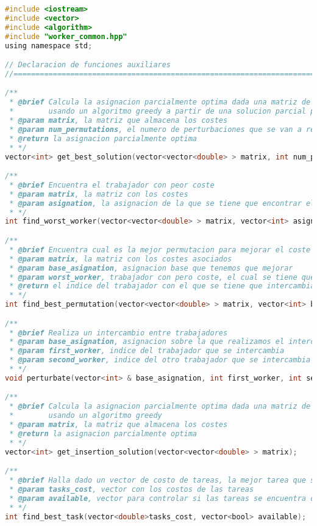 \documentclass[10pt, a4paper]{article}
\theoremstyle{theorem-style}
\theoremstyle{theorem-style}
\theoremstyle{definition-style}
\theoremstyle{remark-style}
\theoremstyle{example-style}
\theoremstyle{definition-style}
\theoremstyle{remark-style}
\begin{document}
\begin{lstlisting}[language=C]
#include <iostream>
#include <vector>
#include <algorithm>
#include "worker_common.hpp"
using namespace std;

// Declaracion de funciones auxiliares
//==============================================================================

/**
 * @brief Calcula la asignacion parcialmente optima dada una matriz de costes, 
 *        usando un algoritmo greedy a partir de una solucion parcial por insercion
 * @param matrix, la matriz que almacena los costes
 * @param num_permutations, el numero de perturbaciones que se van a realizar para mejorar la matriz
 * @return la asignacion parcialmente optima
 * */
vector<int> get_best_solution(vector<vector<double> > matrix, int num_permutations);

/**
 * @brief Encuentra el trabajador con peor coste
 * @param matrix, la matriz con los costes 
 * @param asignation, la asignacion de la que se tiene que encontrar el peor trabajador
 * */
int find_worst_worker(vector<vector<double> > matrix, vector<int> asignation);

/**
 * @brief Encuentra cual es la mejor permutacion para mejorar el coste de una asignacion
 * @param matrix, la matriz con los costes asociados
 * @param base_asignation, asignacion base que tenemos que mejorar
 * @param worst_worker, trabajador con pero coste, el cual se tiene que intercambiar con otro
 * @return el indice del trabajador con el que se tiene que intercambiar el peor trabajador
 * */
int find_best_permutation(vector<vector<double> > matrix, vector<int> base_asignation, int worst_worker);

/**
 * @brief Realiza un intercambio entre trabajadores
 * @param base_asignation, asignacion sobre la que realizamos el intercambio, SE MODIFICA
 * @param first_worker, indice del trabajador que se intercambia
 * @param second_worker, indice del otro trabajador que se intercambia
 * */
void perturbate(vector<int> & base_asignation, int first_worker, int second_worker);

/**
 * @brief Calcula la asignacion parcialmente optima dada una matriz de costes, 
 *        usando un algoritmo greedy
 * @param matrix, la matriz que almacena los costes
 * @return la asignacion parcialmente optima
 * */
vector<int> get_insertion_solution(vector<vector<double> > matrix);

/**
 * @brief Halla dado un vector de costo de tareas, la mejor tarea que se encuentra disponible
 * @param tasks_cost, vector con los costos de las tareas
 * @param available, vector para controlar si las tareas se encuentra o no disponibles
 * */
int find_best_task(vector<double>tasks_cost, vector<bool> available);
        

\end{lstlisting}
\end{document}
